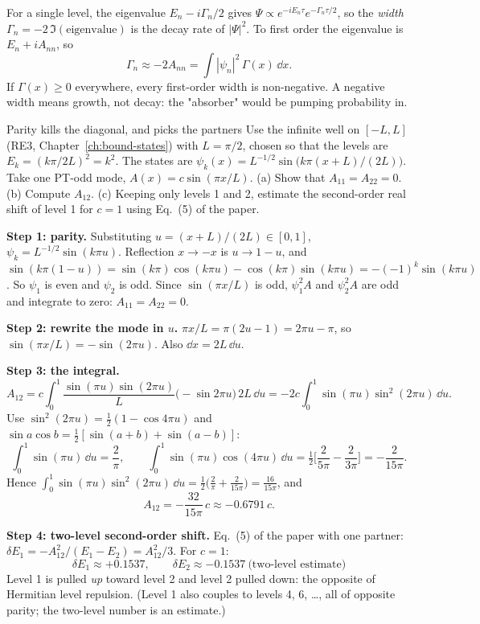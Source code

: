 For a single level, the eigenvalue $E_n-i\Gamma_n/2$ gives $\Psi\propto e^{-iE_n\tau}e^{-\Gamma_n\tau/2}$, so the \emph{width} $\Gamma_n=-2\,\Im(\text{eigenvalue})$ is the decay rate of $|\Psi|^2$. To first order the eigenvalue is $E_n+iA_{nn}$, so
\begin{equation}
\Gamma_n\approx-2A_{nn}=\int|\psi_n|^2\,\Gamma(x)\,\dd x .\label{eq:paper-spurious-floor-width}
\end{equation}
If $\Gamma(x)\ge0$ everywhere, every first-order width is non-negative. A negative width means growth, not decay: the "absorber" would be pumping probability in.

\begin{sample}{Parity kills the diagonal, and picks the partners}
Use the infinite well on $[-L,L]$ (RE3, Chapter~\ref{ch:bound-states}) with $L=\pi/2$, chosen so that the levels are $E_k=(k\pi/2L)^2=k^2$. The states are $\psi_k(x)=L^{-1/2}\sin\big(k\pi(x+L)/(2L)\big)$. Take one PT-odd mode, $A(x)=c\sin(\pi x/L)$. (a) Show that $A_{11}=A_{22}=0$. (b) Compute $A_{12}$. (c) Keeping only levels 1 and 2, estimate the second-order real shift of level 1 for $c=1$ using Eq.~(5) of the paper.

\textbf{Step 1: parity.} Substituting $u=(x+L)/(2L)\in[0,1]$, $\psi_k=L^{-1/2}\sin(k\pi u)$. Reflection $x\to-x$ is $u\to1-u$, and $\sin(k\pi(1-u))=\sin(k\pi)\cos(k\pi u)-\cos(k\pi)\sin(k\pi u)=-(-1)^k\sin(k\pi u)$. So $\psi_1$ is even and $\psi_2$ is odd. Since $\sin(\pi x/L)$ is odd, $\psi_1^2A$ and $\psi_2^2A$ are odd and integrate to zero: $A_{11}=A_{22}=0$.

\textbf{Step 2: rewrite the mode in $u$.} $\pi x/L=\pi(2u-1)=2\pi u-\pi$, so $\sin(\pi x/L)=-\sin(2\pi u)$. Also $\dd x=2L\,\dd u$.

\textbf{Step 3: the integral.}
\[
A_{12}=c\int_0^1\frac{\sin(\pi u)\sin(2\pi u)}{L}\big(-\sin 2\pi u\big)\,2L\,\dd u=-2c\int_0^1\sin(\pi u)\sin^2(2\pi u)\,\dd u .
\]
Use $\sin^2(2\pi u)=\tfrac12(1-\cos4\pi u)$ and $\sin a\cos b=\tfrac12[\sin(a+b)+\sin(a-b)]$:
\[
\int_0^1\sin(\pi u)\,\dd u=\frac{2}{\pi},\qquad
\int_0^1\sin(\pi u)\cos(4\pi u)\,\dd u=\tfrac12\Big[\frac{2}{5\pi}-\frac{2}{3\pi}\Big]=-\frac{2}{15\pi}.
\]
Hence $\int_0^1\sin(\pi u)\sin^2(2\pi u)\,\dd u=\tfrac12\big(\tfrac{2}{\pi}+\tfrac{2}{15\pi}\big)=\tfrac{16}{15\pi}$, and
\[
A_{12}=-\frac{32}{15\pi}\,c\approx-0.6791\,c .
\]

\textbf{Step 4: two-level second-order shift.} Eq.~(5) of the paper with one partner: $\delta E_1=-A_{12}^2/(E_1-E_2)=A_{12}^2/3$. For $c=1$:
\[
\boxed{\delta E_1\approx+0.1537,\qquad \delta E_2\approx-0.1537\ \text{(two-level estimate)}}
\]
Level 1 is pulled \emph{up} toward level 2 and level 2 pulled down: the opposite of Hermitian level repulsion. (Level 1 also couples to levels 4, 6, \dots, all of opposite parity; the two-level number is an estimate.)
\end{sample}

